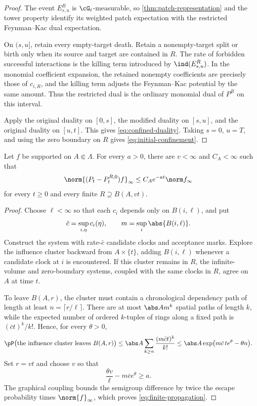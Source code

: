 \begin{proof}
The event \(E_{s,u}^R\) is \(\cG_t\)-measurable, so
\cref{thm:patch-representation} and the tower property identify its
weighted patch expectation with the restricted Feynman--Kac dual
expectation.

On \((s,u]\), retain every empty-target death. Retain a nonempty-target
split or birth only when its source and target are contained in \(R\).
The rate of forbidden successful interactions is the killing term
introduced by \(\ind(E_{s,u}^R)\). In the monomial coefficient
expansion, the retained nonempty coefficients are precisely those of
\(c_{i,R}\), and the killing term adjusts the Feynman--Kac potential
by the same amount. Thus the restricted dual is the ordinary
monomial dual of \(P^R\) on this interval.

Apply the original duality on \([0,s]\), the modified duality on
\([s,u]\), and the original duality on \([u,t]\). This gives
\eqref{eq:confined-duality}. Taking \(s=0\), \(u=T\), and using the
zero boundary on \(R\) gives \eqref{eq:initial-confinement}.
\end{proof}

\begin{lemma}
\label{lem:finite-propagation}
Let \(f\) be supported on \(A\Subset\Lambda\). For every \(a>0\), there
are \(v<\infty\) and \(C_A<\infty\) such that
\begin{equation}
  \norm{(P_t-P_t^{R,0})f}_\infty
  \le
  C_Ae^{-at}\norm f_\infty
  \label{eq:finite-propagation}
\end{equation}
for every \(t\ge0\) and every finite \(R\supseteq B(A,vt)\).
\end{lemma}

\begin{proof}
Choose \(\ell<\infty\) so that each \(c_i\) depends only on
\(B(i,\ell)\), and put
\[
  \bar c=\sup_{i,\eta}c_i(\eta),
  \qquad
  m=\sup_i\abs{B(i,\ell)}.
\]
Construct the system with rate-\(\bar c\) candidate clocks and
acceptance marks. Explore the influence cluster backward from
\(A\times\{t\}\), adding \(B(i,\ell)\) whenever a candidate clock at
\(i\) is encountered. If this cluster remains in \(R\), the
infinite-volume and zero-boundary systems, coupled with the same
clocks in \(R\), agree on \(A\) at time \(t\).

To leave \(B(A,r)\), the cluster must contain a chronological
dependency path of length at least \(n=\lceil r/\ell\rceil\). There
are at most \(\abs A m^k\) spatial paths of length \(k\), while the
expected number of ordered \(k\)-tuples of rings along a fixed path is
\((\bar c t)^k/k!\). Hence, for every \(\theta>0\),
\[
  \pP\bigl(
    \text{the influence cluster leaves }B(A,r)
  \bigr)
  \le
  \abs A
  \sum_{k\ge n}\frac{(m\bar c t)^k}{k!}
  \le
  \abs A
  \exp\bigl(m\bar c\,t e^\theta-\theta n\bigr).
\]
Set \(r=vt\) and choose \(v\) so that
\[
  \frac{\theta v}{\ell}-m\bar c e^\theta\ge a.
\]
The graphical coupling bounds the semigroup difference by twice the
escape probability times \(\norm{f}_\infty\), which proves
\eqref{eq:finite-propagation}.
\end{proof}
